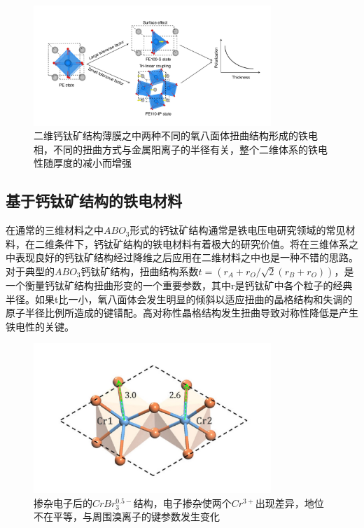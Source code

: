 \begin{figure}[h]
    \centering
\includegraphics[width=0.8\textwidth]{./pic/014.png}
\caption{二维钙钛矿结构薄膜之中两种不同的氧八面体扭曲结构形成的铁电相，不同的扭曲方式与金属阳离子的半径有关，整个二维体系的铁电性随厚度的减小而增强}

\label{dog014}
\end{figure}

\subsection{基于钙钛矿结构的铁电材料}

在通常的三维材料之中$ABO_{3}$形式的钙钛矿结构通常是铁电压电研究领域的常见材料，在二维条件下，钙钛矿结构的铁电材料有着极大的研究价值。将在三维体系之中表现良好的钙钛矿结构经过降维之后应用在二维材料之中也是一种不错的思路。对于典型的$ABO_{3}$钙钛矿结构，扭曲结构系数$t=(r_{A}+r_{O}/\sqrt{2}(r_{B}+r_{O}))$，是一个衡量钙钛矿结构扭曲形变的一个重要参数，其中r是钙钛矿中各个粒子的经典半径。如果t比一小，氧八面体会发生明显的倾斜以适应扭曲的晶格结构和失调的原子半径比例所造成的键错配。高对称性晶格结构发生扭曲导致对称性降低是产生铁电性的关键。

\begin{figure}[h]
    \centering
\includegraphics[width=0.8\textwidth]{./pic/010-3.png}
\caption{掺杂电子后的$CrBr_{3}^{0.5-}$结构，电子掺杂使两个$Cr^{3+}$出现差异，地位不在平等，与周围溴离子的键参数发生变化}

\label{dog010-3}
\end{figure}

